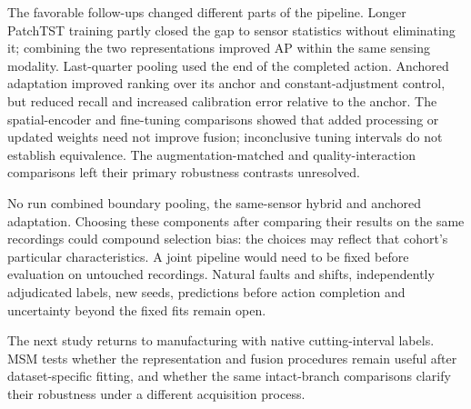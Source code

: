 The favorable follow-ups changed different parts of the pipeline. Longer PatchTST
training partly closed the gap to sensor statistics without eliminating it; combining
the two representations improved AP within the same sensing modality. Last-quarter
pooling used the end of the completed action. Anchored adaptation improved ranking over
its anchor and constant-adjustment control, but reduced recall and increased calibration
error relative to the anchor. The spatial-encoder and fine-tuning comparisons showed
that added processing or updated weights need not improve fusion; inconclusive tuning
intervals do not establish equivalence. The augmentation-matched and quality-interaction
comparisons left their primary robustness contrasts unresolved.

No run combined boundary pooling, the same-sensor hybrid and anchored adaptation.
Choosing these components after comparing their results on the same recordings could
compound selection bias: the choices may reflect that cohort's particular
characteristics. A joint pipeline would need to be fixed before evaluation on untouched
recordings. Natural faults and shifts, independently adjudicated labels, new seeds,
predictions before action completion and uncertainty beyond the fixed fits remain
open.

The next study returns to manufacturing with native cutting-interval labels. MSM tests
whether the representation and fusion procedures remain useful after dataset-specific
fitting, and whether the same intact-branch comparisons clarify their robustness under
a different acquisition process.
